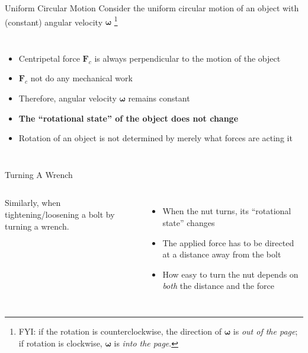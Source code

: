 \documentclass[12pt,compress,aspectratio=169]{beamer}
\begin{document}
\begin{frame}{Uniform Circular Motion}
  Consider the uniform circular motion of an object with (constant)
  angular velocity $\bm\omega$ \footnote{FYI: if the rotation is
    counterclockwise, the direction of $\bm\omega$ is \emph{out of the page};
    if rotation is clockwise, $\bm\omega$ is \emph{into the page}.}
  \begin{columns}
    \centering

    \begin{itemize}
    \item Centripetal force $\bm{F}_c$ is always perpendicular to the
      motion of the object
    \item $\bm{F}_c$ not do any mechanical work
    \item Therefore,  angular velocity $\bm\omega$ remains constant
    \item\textbf{The ``rotational state'' of the object does not change}
    \item Rotation of an object is not determined by merely what forces are
      acting it
    \end{itemize}
  \end{columns}
\end{frame}



\begin{frame}{Turning A Wrench}
  \begin{columns}
    
    Similarly, when tightening/loosening a bolt by turning a wrench.
    \begin{itemize}
    \item When the nut turns, its ``rotational state'' changes
    \item The applied force has to be directed at a distance away from the
      bolt
    \item How easy to turn the nut depends on \emph{both} the distance and the
      force
    \end{itemize}
  \end{columns}
\end{frame}
\end{document}
